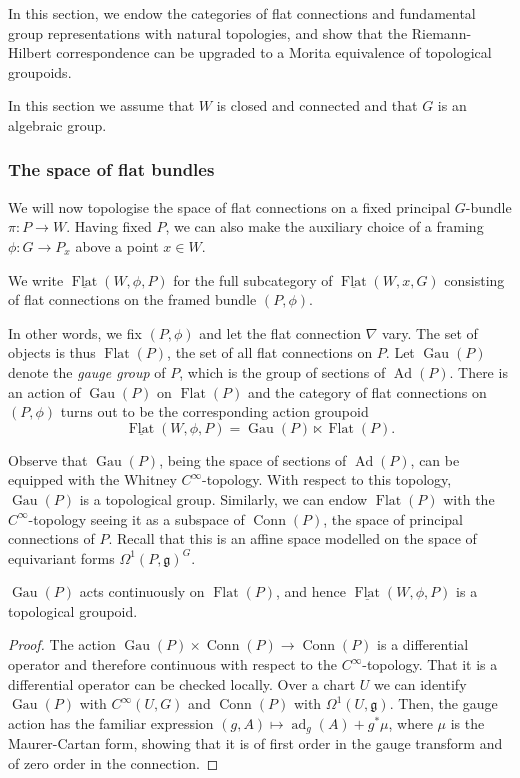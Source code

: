 \documentclass[10pt]{amsart}
\newcommand{\FlatCat}{{\underline{\operatorname{Flat}}}}
\newcommand{\FlatObj}{{\operatorname{Flat}}}
\newcommand{\Conn}{{\operatorname{Conn}}}
\DeclareMathOperator{\Gau}{Gau}
\DeclareMathOperator{\Ad}{Ad}
\DeclareMathOperator{\ad}{ad}
\numberwithin{theoremalpha}{section}
\numberwithin{equation}{section}
\numberwithin{definition}{section}
\numberwithin{theorem}{section}
\numberwithin{proposition}{section}
\numberwithin{lemma}{section}
\numberwithin{example}{section}
\numberwithin{remark}{section}
\numberwithin{corollary}{section}
\numberwithin{question}{section}
\numberwithin{problem}{section}
\numberwithin{assumption}{section}
\theoremstyle{named}
\numberwithin{equation}{section}
\begin{document}
In this section, we endow the categories of flat connections and fundamental group representations with natural topologies, and show that the Riemann-Hilbert correspondence can be upgraded to a Morita equivalence of topological groupoids.
\begin{assumption}
In this section we assume that $W$ is closed and connected and that $G$ is an algebraic group. 
\end{assumption} 

\subsubsection{The space of flat bundles} 

We will now topologise the space of flat connections on a fixed principal $G$-bundle $\pi : P \to W$. Having fixed $P$, we can also make the auxiliary choice of a framing $\phi: G \to P_{x}$ above a point $x \in W$.
\begin{definition} \label{def:framedflatbundle}
We write $\FlatCat(W, \phi, P)$ for the full subcategory of $\FlatCat(W, x, G)$ consisting of flat connections on the framed bundle $(P,\phi)$.
\end{definition}
In other words, we fix $(P, \phi)$ and let the flat connection $\nabla$ vary. The set of objects is thus $\FlatObj(P)$, the set of all flat connections on $P$. Let $\Gau(P)$ denote the \emph{gauge group} of $P$, which is the group of sections of $\Ad(P)$. There is an action of $\Gau(P)$ on $\FlatObj(P)$ and the category of flat connections on $(P, \phi)$ turns out to be the corresponding action groupoid 
\[ \FlatCat(W, \phi, P) = \Gau(P) \ltimes \FlatObj(P). \]

Observe that $\Gau(P)$, being the space of sections of $\Ad(P)$, can be equipped with the Whitney $C^{\infty}$-topology. With respect to this topology, $\Gau(P)$ is a topological group. Similarly, we can endow $\FlatObj(P)$ with the $C^{\infty}$-topology seeing it as a subspace of $\Conn(P)$, the space of principal connections of $P$. Recall that this is an affine space modelled on the space of equivariant forms $\Omega^1(P,\mathfrak{g})^G$.
\begin{lemma} \label{continuousaction}
$\Gau(P)$ acts continuously on $\FlatObj(P)$, and hence $\FlatCat(W, \phi, P)$ is a topological groupoid. 
\end{lemma}
\begin{proof}
The action $\Gau(P) \times \Conn(P) \rightarrow \Conn(P)$ is a differential operator and therefore continuous with respect to the $C^\infty$-topology. That it is a differential operator can be checked locally. Over a chart $U$ we can identify $\Gau(P)$ with $C^\infty(U,G)$ and $\Conn(P)$ with $\Omega^1(U,\mathfrak{g})$. Then, the gauge action has the familiar expression $(g,A) \mapsto \ad_g(A) + g^*\mu$, where $\mu$ is the Maurer-Cartan form, showing that it is of first order in the gauge transform and of zero order in the connection.
\end{proof}
\end{document}
